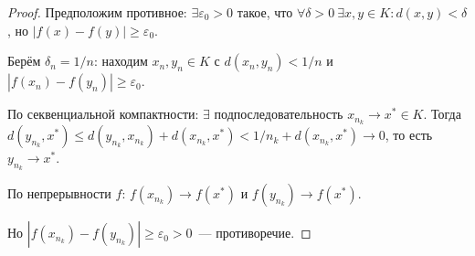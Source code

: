 \documentclass[12pt]{article}
\begin{document}
	\begin{proof}
		Предположим противное: $\exists \varepsilon_0 > 0$ такое, что $\forall \delta > 0 \ \exists x, y \in K: d(x, y) < \delta$, но $|f(x) - f(y)| \geqslant \varepsilon_0$.
		
		Берём $\delta_n = 1/n$: находим $x_n, y_n \in K$ с $d(x_n, y_n) < 1/n$ и $|f(x_n) - f(y_n)| \geqslant \varepsilon_0$.
		
		По секвенциальной компактности: $\exists$ подпоследовательность $x_{n_k} \to x^* \in K$. Тогда $d(y_{n_k}, x^*) \leqslant d(y_{n_k}, x_{n_k}) + d(x_{n_k}, x^*) < 1/n_k + d(x_{n_k}, x^*) \to 0$, то есть $y_{n_k} \to x^*$.
		
		По непрерывности $f$: $f(x_{n_k}) \to f(x^*)$ и $f(y_{n_k}) \to f(x^*)$.
		
		Но $|f(x_{n_k}) - f(y_{n_k})| \geqslant \varepsilon_0 > 0$~--- противоречие.
	\end{proof}
\end{document}
